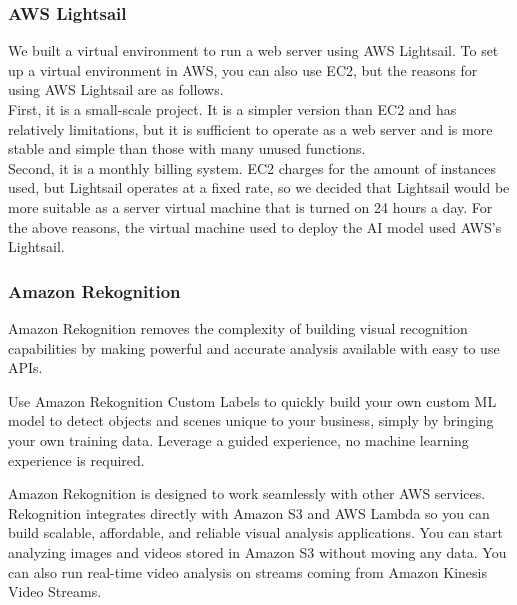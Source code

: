 \subsubsection{\textbf{AWS Lightsail}}
We built a virtual environment to run a web server using AWS Lightsail. To set up a virtual environment in AWS, you can also use EC2, but the reasons for using AWS Lightsail are as follows.\\
First, it is a small-scale project. It is a simpler version than EC2 and has relatively limitations, but it is sufficient to operate as a web server and is more stable and simple than those with many unused functions.\\
Second, it is a monthly billing system. EC2 charges for the amount of instances used, but Lightsail operates at a fixed rate, so we decided that Lightsail would be more suitable as a server virtual machine that is turned on 24 hours a day. For the above reasons, the virtual machine used to deploy the AI model used AWS's Lightsail.\\

\subsubsection{\textbf{Amazon Rekognition}}
Amazon Rekognition removes the complexity of building visual recognition capabilities by making powerful and accurate analysis available with easy to use APIs.

Use Amazon Rekognition Custom Labels to quickly build your own custom ML model to detect objects and scenes unique to your business, simply by bringing your own training data. Leverage a guided experience, no machine learning experience is required.

Amazon Rekognition is designed to work seamlessly with other AWS services. Rekognition integrates directly with Amazon S3 and AWS Lambda so you can build scalable, affordable, and reliable visual analysis applications. You can start analyzing images and videos stored in Amazon S3 without moving any data. You can also run real-time video analysis on streams coming from Amazon Kinesis Video Streams.\\

